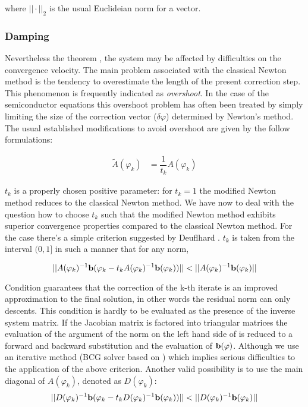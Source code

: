 where $||\cdot ||_2$ is the usual Euclideian norm for a vector.
\subsubsection{Damping}

Nevertheless the theorem , the system  may be affected by difficulties on the convergence velocity.
The main problem associated with the classical Newton method is the tendency to overestimate the length of the present correction step. This phenomenon is frequently indicated as \textit{overshoot}. In the case of the semiconductor equations this overshoot problem has often been treated by simply limiting the size of the correction vector ($\delta \varphi$) determined by Newton's method. The usual established modifications to avoid overshoot are given by the follow formulations:


\begin{align}
\tilde{A}(\varphi_k)&=\dfrac{1}{t_k}A(\varphi_k) \label{eq: NLP mod used}
\end{align}

$t_k$ is a properly chosen positive parameter: for $t_k=1$ the modified Newton method reduces to the classical Newton method. We have now to deal with the question how to choose $t_k$ such that the modified Newton method exhibits superior convergence properties compared to the classical Newton method.
For the case  there's a simple criterion suggested by Deuflhard \cite{DefulhardDamp}. $t_k$ is taken from the interval $(0,1]$ in such a manner that for any norm,

\begin{equation}
\label{eq: extended criterion}
||A(\varphi_k)^{-1}\vect{b}(\varphi_k-t_kA(\varphi_k)^{-1}\vect{b}(\varphi_k))||<||A(\varphi_k)^{-1}\vect{b}(\varphi_k)||
\end{equation}

Condition  guarantees that the correction of the k-th iterate is an improved approximation to the final solution, in other words the residual norm can only descents.
This condition is hardly to be evaluated as the presence of the inverse system matrix. If the Jacobian matrix is factored into triangular matrices the evaluation of the argument of the norm on the left hand side of  is reduced to a forward and backward substitution and the evaluation of $\mathbf{b}(\varphi)$. Although we use an iterative method (BCG solver based on \cite{NumericalRecipes}) which implies serious difficulties to the application of the above criterion. Another valid possibility is to use the main diagonal of $A(\varphi_k)$, denoted as $D(\varphi_k)$:
\begin{equation}
\label{eq: easy criterion}
||D(\varphi_k)^{-1}\vect{b}(\varphi_k-t_kD(\varphi_k)^{-1}\vect{b}(\varphi_k))||<||D(\varphi_k)^{-1}\vect{b}(\varphi_k)||
\end{equation}

